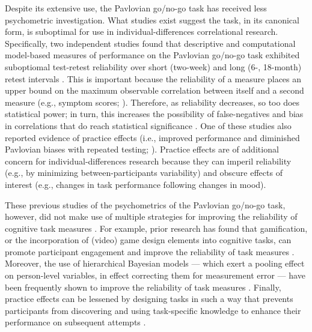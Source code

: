 \documentclass[a4paper,12pt]{article}
\begin{document}
\begin{refsection}[main]
Despite its extensive use, the Pavlovian go/no-go task has received less psychometric investigation. What studies exist suggest the task, in its canonical form, is suboptimal for use in individual-differences correlational research. Specifically, two independent studies found that descriptive and computational model-based measures of performance on the Pavlovian go/no-go task exhibited suboptiomal test-retest reliability over short (two-week) and long (6-, 18-month) retest intervals \cite{moutoussis2018change, pike2022test}. This is important because the reliability of a measure places an upper bound on the maximum observable correlation between itself and a second measure (e.g., symptom scores; \cite{Spearman1904-mo}). Therefore, as reliability decreases, so too does statistical power; in turn, this increases the possibility of false-negatives \cite{Parsons2019-jw} and bias in correlations that do reach statistical significance \cite{gelman2014beyond}. One of these studies also reported evidence of practice effects (i.e., improved performance and diminished Pavlovian biases with repeated testing; \cite{moutoussis2018change}). Practice effects are of additional concern for individual-differences research because they can imperil reliability (e.g., by minimizing between-participants variability) and obscure effects of interest (e.g., changes in task performance following changes in mood).

These previous studies of the psychometrics of the Pavlovian go/no-go task, however, did not make use of multiple strategies for improving the reliability of cognitive task measures \cite{zorowitz2023improving}. For example, prior research has found that gamification, or the incorporation of (video) game design elements into cognitive tasks, can promote participant engagement \cite{sailer2017gamification} and improve the reliability of task measures \cite{kucina2022solution, verdejo2021unified}. Moreover, the use of hierarchical Bayesian models --- which exert a pooling effect on person-level variables, in effect correcting them for measurement error \cite{haines2023classical, rouder2019psychometrics} --- have been frequently shown to improve the reliability of task measures \cite{sullivan2022enhancing, brown2020improving, waltmann2022sufficient}. Finally, practice effects can be lessened by designing tasks in such a way that prevents participants from discovering and using task-specific knowledge to enhance their performance on subsequent attempts \cite{mclean2018towards}. 


\end{refsection}
\end{document}
